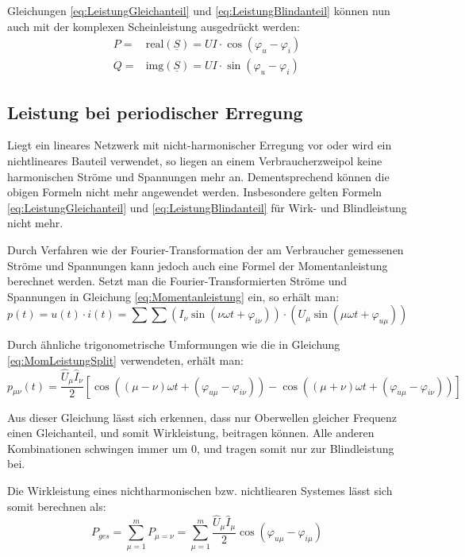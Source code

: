 Gleichungen \eqref{eq:LeistungGleichanteil} und \eqref{eq:LeistungBlindanteil} können nun auch mit der komplexen Scheinleistung ausgedrückt werden:
\begin{eqnarray}
P=& \mbox{real}(\underline{S}) = UI\cdot \cos(\varphi_u-\varphi_i)\label{eq:KomplexP}\\
Q=& \mbox{img}(\underline{S}) = UI\cdot \sin(\varphi_u-\varphi_i) \label{eq:KomplexQ}
\end{eqnarray}

\subsection{Leistung bei periodischer Erregung}
Liegt ein lineares Netzwerk mit nicht-harmonischer Erregung vor oder wird ein nichtlineares Bauteil verwendet, so liegen an einem Verbraucherzweipol keine harmonischen Ströme und Spannungen mehr an. Dementsprechend können die obigen Formeln nicht mehr angewendet werden. Insbesondere gelten Formeln \eqref{eq:LeistungGleichanteil} und \eqref{eq:LeistungBlindanteil} für Wirk- und Blindleistung nicht mehr.

Durch Verfahren wie der Fourier-Transformation der am Verbraucher gemessenen Ströme und Spannungen kann jedoch auch eine Formel der Momentanleistung berechnet werden. Setzt man die Fourier-Transformierten Ströme und Spannungen in Gleichung \eqref{eq:Momentanleistung} ein, so erhält man:
\begin{equation*}
p(t)=u(t)\cdot i(t) = \sum\sum\left(I_\nu\sin(\nu \omega t+ \varphi_{i\nu})\right) \cdot \left(U_\mu\sin(\mu \omega t + \varphi_{u\mu})\right)
\end{equation*}

Durch ähnliche trigonometrische Umformungen wie die in Gleichung \eqref{eq:MomLeistungSplit} verwendeten, erhält man:
\begin{equation}
p_{\mu\nu}(t)=\frac{\hat{U}_\mu\hat{I}_\nu}{2}\left[\cos((\mu-\nu)\omega t + (\varphi_{u\mu}-\varphi_{i\nu}))-\cos((\mu+\nu)\omega t + (\varphi_{u\mu}-\varphi_{i\nu}))\right]
\end{equation}

Aus dieser Gleichung lässt sich erkennen, dass nur Oberwellen gleicher Frequenz einen Gleichanteil, und somit Wirkleistung, beitragen können. Alle anderen Kombinationen schwingen immer um 0, und tragen somit nur zur Blindleistung bei.

Die Wirkleistung eines nichtharmonischen bzw. nichtliearen Systemes lässt sich somit berechnen als:
\begin{equation}
P_{ges}=\sum_{\mu = 1}^mP_{\mu=\nu}=\sum_{\mu = 1}^m\frac{\hat{U}_\mu\hat{I}_\mu}{2}\cos(\varphi_{u\mu}-\varphi_{i\mu}) \label{eq:WirkleistungFourier}
\end{equation}


